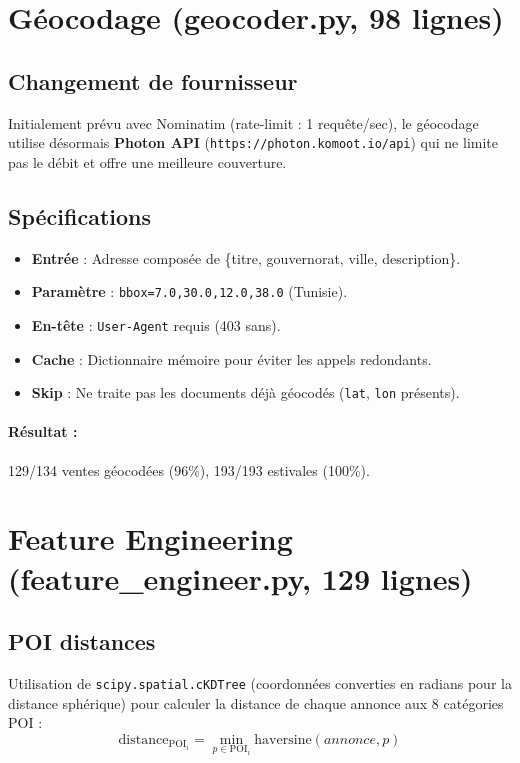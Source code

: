 \documentclass[12pt,a4paper]{report}
\begin{document}
\section{Géocodage (geocoder.py, 98 lignes)}

\subsection{Changement de fournisseur}
Initialement prévu avec Nominatim (rate-limit : 1 requête/sec), le géocodage utilise désormais \textbf{Photon API} (\texttt{https://photon.komoot.io/api}) qui ne limite pas le débit et offre une meilleure couverture.

\subsection{Spécifications}
\begin{itemize}
    \item \textbf{Entrée} : Adresse composée de \{titre, gouvernorat, ville, description\}.
    \item \textbf{Paramètre} : \texttt{bbox=7.0,30.0,12.0,38.0} (Tunisie).
    \item \textbf{En-tête} : \texttt{User-Agent} requis (403 sans).
    \item \textbf{Cache} : Dictionnaire mémoire pour éviter les appels redondants.
    \item \textbf{Skip} : Ne traite pas les documents déjà géocodés (\texttt{lat}, \texttt{lon} présents).
\end{itemize}

\paragraph{Résultat :} 129/134 ventes géocodées (96\%), 193/193 estivales (100\%).

\section{Feature Engineering (feature\_engineer.py, 129 lignes)}

\subsection{POI distances}
Utilisation de \texttt{scipy.spatial.cKDTree} (coordonnées converties en radians pour la distance sphérique) pour calculer la distance de chaque annonce aux 8 catégories POI :
\[
\mathrm{distance}_{\mathrm{POI}_i} = \min_{p \in \mathrm{POI}_i} \mathrm{haversine}(annonce, p)
\]
\end{document}
